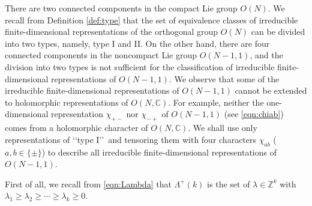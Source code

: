 There are two connected components in the compact Lie group $O(N)$.  
We recall from Definition \ref{def:type}
 that the set of equivalence classes
 of irreducible finite-dimensional representations
 of the orthogonal group $O(N)$
 can be divided into two types,
 namely,
 type I and II.  
On the other hand,
 there are four connected components in the noncompact Lie group $O(N-1,1)$, 
 and the division into two types 
 is not sufficient for the classification 
 of irreducible finite-dimensional representations of $O(N-1,1)$.  
We observe
 that some of the irreducible finite-dimensional representations
 of $O(N-1,1)$ cannot be extended to holomorphic representations
 of $O(N,{\mathbb{C}})$. 
For example,
 neither the one-dimensional representation $\chi_{+-}$ nor $\chi_{-+}$
 of $O(N-1,1)$ (see \eqref{eqn:chiab}) comes from a holomorphic character
 of $O(N,{\mathbb{C}})$.  
We shall use only representations
 of 
 \lq\lq{type I}\rq\rq\
 and tensoring them with four characters
 $\chi_{ab}$ ($a,b \in \{\pm\}$)
 to describe all irreducible finite-dimensional representations of $O(N-1,1)$.  


First of all, 
 we recall from \eqref{eqn:Lambda}
 that 
$\Lambda^+(k)$ is the set of 
 $\lambda \in {\mathbb{Z}}^k$
 with $\lambda_1 \ge \lambda_2 \ge \cdots \ge \lambda_k
\ge 0$.  



